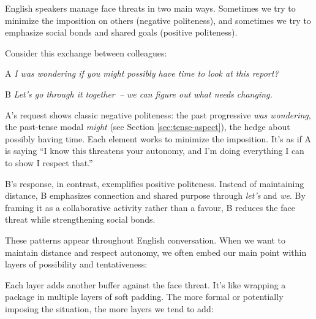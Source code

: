 English speakers manage face threats in two main ways. Sometimes we try to minimize the imposition on others (negative politeness), and sometimes we try to emphasize social bonds and shared goals (positive politeness).

Consider this exchange between colleagues:

\begin{dialogue}
\item[A] \textit{I was wondering if you might possibly have time to look at this report?}
\item[B] \textit{Let's go through it together~-- we can figure out what needs changing.}
\end{dialogue}

A's request shows classic negative politeness: the past progressive \textit{was wondering}, the past-tense modal \textit{might} (see Section \ref{sec:tense-aspect}), the hedge about possibly having time. Each element works to minimize the imposition. It's as if A is saying ``I know this threatens your autonomy, and I'm doing everything I can to show I respect that.''

B's response, in contrast, exemplifies positive politeness. Instead of maintaining distance, B emphasizes connection and shared purpose through \textit{let's} and \textit{we}. By framing it as a collaborative activity rather than a favour, B reduces the face threat while strengthening social bonds.

These patterns appear throughout English conversation. When we want to maintain distance and respect autonomy, we often embed our main point within layers of possibility and tentativeness:

\ea
    \z
\z

\noindent Each layer adds another buffer against the face threat. It's like wrapping a package in multiple layers of soft padding. The more formal or potentially imposing the situation, the more layers we tend to add:

\z


